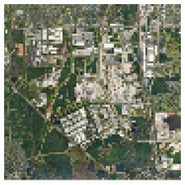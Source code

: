 \begin{figure}[H]
\begin{subfigure}[b]{0.3\textwidth}
    \end{subfigure}
    \hfill
    \begin{subfigure}[b]{0.3\textwidth}
        \includegraphics[width=\textwidth]{4.Payload/HoustonGSD80.jpg}
    \end{subfigure}

    \vspace{1em}


\end{figure}
